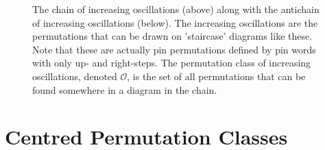 \documentclass[11pt,a4paper]{article}
\theoremstyle{definition}
\newcommand{\fitellipsis}[2] %
{\draw let \p1=(#1), \p2=(#2), \n1={atan2(\y2-\y1,\x2-\x1)}, \n2={veclen(\y2-\y1,\x2-\x1)}
    in ($ (\p1)!0.5!(\p2) $) ellipse [x radius=\n2/2+0.5cm, y radius=0.5cm, rotate=\n1];
}
\begin{document}
\begin{figure}[h]
\begin{center}
\end{center}
\caption{The chain of increasing oscillations (above) along with the antichain of increasing oscillations (below). The increasing oscillations are the permutations that can be drawn on 'staircase' diagrams like these. Note that these are actually pin permutations defined by pin words with only up- and right-steps. The permutation class of increasing oscillations, denoted $\mathcal{O}$, is the set of all permutations that can be found somewhere in a diagram in the chain.}
\label{fig:osc0}
\end{figure}

\section{Centred Permutation Classes} \label{sec:2}
\end{document}

